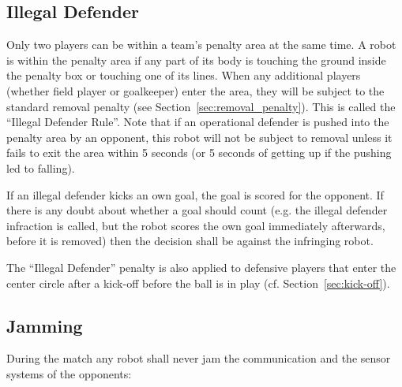 \documentclass[12pt]{article}
\newcommand{\cf}{\mbox{cf.}\xspace}
\begin{document}
\subsection{Illegal Defender}
\label{sec:illegal_defender}

Only two players can be within a team's penalty area at the same time. A robot is within the penalty area if any part of its body is touching the ground inside the penalty box or touching one of its lines.  When any additional players (whether field player or goalkeeper) enter the area, they will be subject to the standard removal penalty (see Section~\ref{sec:removal_penalty}). This is called the ``Illegal Defender Rule''. Note that if an operational defender is pushed into the penalty area by an opponent, this robot will not be subject to removal unless it fails to exit the area within 5 seconds (or 5 seconds of getting up if the pushing led to falling).

If an illegal defender kicks an own goal, the goal is scored for the opponent. If there is any doubt about whether a goal should count (e.g. the illegal defender infraction is called, but the robot scores the own goal immediately afterwards, before it is removed) then the decision shall be against the infringing robot.

The ``Illegal Defender'' penalty is also applied to defensive players that enter the center circle after a kick-off before the ball is in play (\cf Section~\ref{sec:kick-off}).

\subsection{Jamming}
\label{sec:jamming}
During the match any robot shall never jam the communication and the sensor systems of the opponents:
\end{document}
